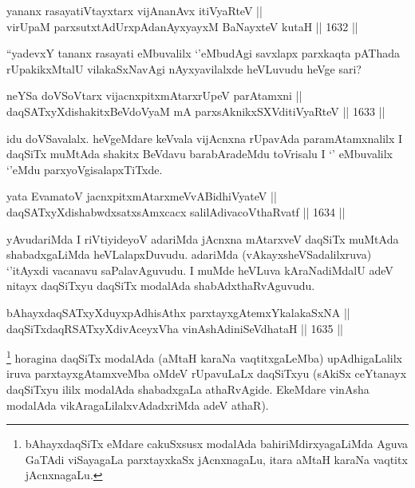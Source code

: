 
\begin{shl}
yananx rasayatiVtayxtarx vijAnanAvx itiVyaRteV || \\
virUpaM parxsutxtAdUrxpAdanAyxyayxM BaNayxteV kutaH \hfill || 1632 ||  
\end{shl}

\begin{artha}
``yadevxY tananx rasayati eMbuvalilx `\stext'eMbudAgi savxlapx parxkaqta pAThada rUpakikxMtalU vilakaSxNavAgi nAyxyavilalxde heVLuvudu heVge sari?
\end{artha}

\begin{shl}
neYSa doVSoV\s tarx vijacnxpitxmAtarxrUpeV parAtamxni || \\
daqSATxyXdishakitxBeVdoV\s yaM mA parxsAknikxSXVditiVyaRteV \hfill || 1633 ||  
\end{shl}

\begin{artha}
idu doVSavalalx. heVgeMdare keVvala vijAcnxna rUpavAda paramAtamxnalilx I daqSiTx muMtAda shakitx BeVdavu barabAradeMdu toVrisalu I `\stext' eMbuvalilx `\stext'eMdu parxyoVgisalapxTiTxde.
\end{artha}

\begin{shl}
yata EvamatoV jacnxpitxmAtarxmeVvABidhiVyateV ||  \\
daqSATxyXdishabwdxsatxsAmxcacx salilAdivacoV\s thaRvatf \hfill || 1634 ||  
\end{shl}

\begin{artha}
yAvudariMda I riVtiyideyoV adariMda jAcnxna mAtarxveV daqSiTx muMtAda shabadxgaLiMda heVLalapxDuvudu. adariMda (vAkayxsheVSadalilxruva) `\stext'itAyxdi vacanavu saPalavAguvudu. I muMde heVLuva kAraNadiMdalU adeV nitayx daqSiTxyu daqSiTx modalAda shabAdxthaRvAguvudu.
\end{artha}

\begin{shl}
bAhayxdaqSATxyXduyxpAdhisAthx parxtayxgAtemxYkalakaSxNA || \\
daqSiTxdaqRSATxyXdivAceyxVha vinAshAdiniSeVdhataH \hfill || 1635 ||  
\end{shl}

\begin{artha}
\footnote{bAhayxdaqSiTx eMdare cakuSxsusx modalAda bahiriMdirxyagaLiMda Aguva GaTAdi viSayagaLa parxtayxkaSx jAcnxnagaLu, itara aMtaH karaNa vaqtitx jAcnxnagaLu.}
horagina daqSiTx modalAda (aMtaH karaNa vaqtitxgaLeMba) upAdhigaLalilx iruva parxtayxgAtamxveMba oMdeV rUpavuLaLx daqSiTxyu (sAkiSx ceYtanayx daqSiTxyu ililx modalAda shabadxgaLa athaRvAgide. EkeMdare vinAsha modalAda vikAragaLilalxvAdadxriMda adeV athaR).
\end{artha}

